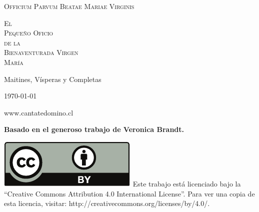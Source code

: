 \documentclass[12pt,a5paper,openright]{memoir}
\begin{document}

\thispagestyle{empty}


\null\vfill
\begin{center}
	\large
	\textsc{Officium Parvum Beatae Mariae Virginis}

	\bigskip

	\huge
	\textsc{\gregorian El \\ Pequeño Oficio \\ de la  \\ Bienaventurada Virgen \\ María}

	\bigskip
	\bigskip
	\bigskip


	\normalsize Maitines, Vísperas y Completas


	\footnotesize


\end{center}
\null\vfill


\newpage
\thispagestyle{empty}

\null\vfill
\begin{center}

	\today

	www.cantatedomino.cl

	\bigskip
	\bigskip
	\bigskip
	\bigskip
	\bigskip
	\bigskip

	\footnotesize

	\textbf{Basado en el generoso trabajo de Veronica Brandt. }

	\bigskip
	\bigskip
	\bigskip

	\begin{minipage}{0.6\textwidth}



		\includegraphics[height=0.8\baselineskip]{by.pdf} Este trabajo está licenciado bajo la ``Creative Commons Attribution 4.0 International License''. Para ver una copia de esta licencia, visitar:
		http://creativecommons.org/licenses/by/4.0/.

	\end{minipage}


\end{center}
\null\vfill
\end{document}
